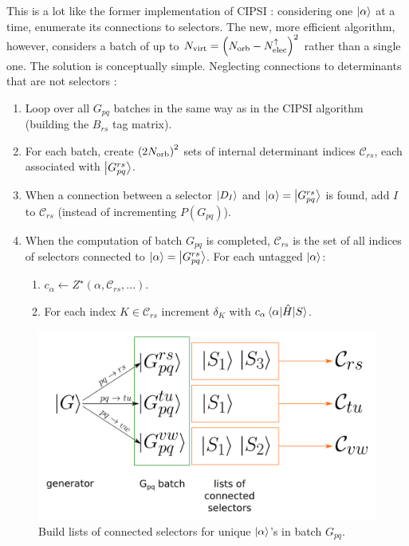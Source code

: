 \documentclass[./thesis.tex]{subfiles}
\begin{document}
This is a lot like the former implementation of CIPSI : considering one ${\ket{\alpha}}$ at a time, enumerate its connections to selectors. The new, more efficient algorithm, however, considers a batch of up to ${N_\text{virt}} = \qty({N_\text{orb}} - {N_\text{elec}^{\uparrow}})^2$ rather than a single one. The solution is conceptually simple. Neglecting connections to determinants that are not selectors :
\begin{enumerate}
\item
Loop over all $G_{pq}$ batches in the same way as in the CIPSI algorithm (building the $B_{rs}$ tag matrix).
\item
For each batch, create ${(2 {N_\text{orb}})}^2$ sets of internal determinant indices $\mathcal{C}_{rs}$, each associated with $\ket{G^{rs}_{pq}}$.
\item
When a connection between a selector $\ket {D_I}$ and ${\ket{\alpha}} = \ket {G_{pq}^{rs}}$ is found, add $I$ to $\mathcal{C}_{rs}$ (instead of incrementing $P(G_{pq})$).
\item
When the computation of batch $G_{pq}$ is completed, $\mathcal{C}_{rs}$ is the set of all indices of selectors connected to ${\ket{\alpha}} = \ket {G_{pq}^{rs}}$. For each untagged ${\ket{\alpha}}$:
\begin{enumerate}
\item
$c_\alpha \gets Z^\star(\alpha, \mathcal{C}_{rs}, \ldots)$.
\item
For each index $K \in \mathcal{C}_{rs}$ increment $\delta_K$ with $c_\alpha \mel{\alpha}{\hat{H}}{S}$.
\end{enumerate}


\end{enumerate}


\begin{figure}[h!]
	\begin{center}
		\includegraphics[width=0.7\columnwidth]{figures/matrix_dressing/buildlists}
		\caption{Build lists of connected selectors for unique ${\ket{\alpha}}$'s in batch $G_{pq}$.}
		\label{fig:buildlists}
	\end{center}
\end{figure}
\end{document}
